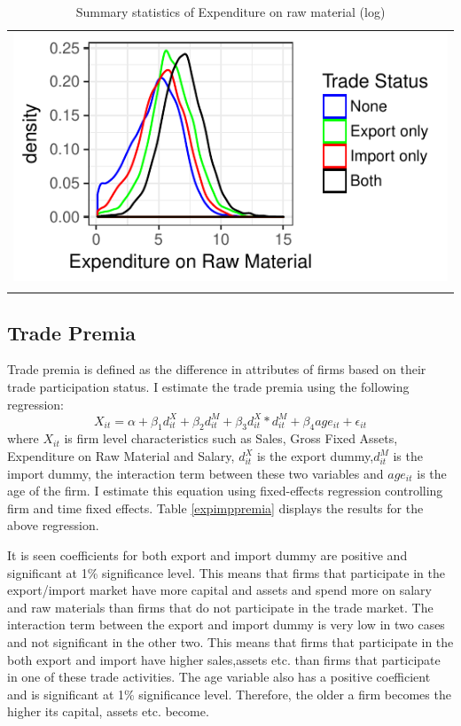 \documentclass[11pt]{article}
\begin{document}
\begin{center}
\begin{table}[htp]
\caption{Summary statistics of Expenditure on raw material (log)}
\label{tab:lrawmat}
\begin{tabular}{c}
 \includegraphics{./PICS/denslrawmat.pdf}   \\ 
   \\  
\end{tabular}
\end{table}
\end{center}
\subsection{Trade Premia}
Trade premia is defined as the difference in
attributes of firms based on their trade participation status. I
estimate the trade premia using the following regression:
$$ X_{it} = \alpha + \beta_{1} d_{it}^{X}+ \beta_{2} d_{it}^{M}+
\beta_{3} d_{it}^{X}*d_{it}^{M} + \beta_{4} age_{it} + \epsilon_{it}$$
where $X_{it}$ is firm level characteristics such as Sales, Gross
Fixed Assets, Expenditure on Raw Material and Salary, $d_{it}^X$ is
the export dummy,$d_{it}^M$ is
the import  dummy, the interaction term between these two variables
and $age_{it}$ is the age of the firm. I estimate this equation using
fixed-effects regression controlling firm and time fixed
effects. Table \ref{expimppremia} displays the results for the above
regression. 
\begin{center}

\end{center}
It is seen coefficients for both export and import dummy are positive
and significant at 1\% significance level. This means that firms that
participate in the export/import market have more capital and assets
and spend more on salary and raw materials than firms that do not
participate in the trade market. The interaction term between the
export and import dummy is very low in two cases and not significant
in the other two. This means that firms that participate in the both
export and import have  higher sales,assets etc. than firms that
participate in one of these trade activities. The age variable also
has a positive coefficient and is significant at 1\% significance
level. Therefore, the older a firm becomes the higher its capital,
assets etc. become. 
\end{document}

